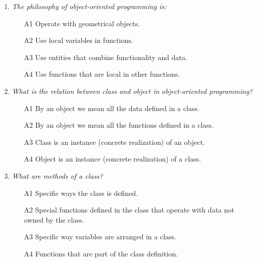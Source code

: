 \begin{enumerate}

\item {\em The philosophy of object-oriented programming is:}\\

\begin{enumerate}
\item[A1] Operate with geometrical objects.
\item[A2] Use local variables in functions.
\item[A3] Use entities that combine functionality and data.
\item[A4] Use functions that are local in other functions.
\end{enumerate}

\vspace{6mm}

\item {\em What is the relation between {\em class} and {\em object} in object-oriented programming?}\\

\begin{enumerate}
\item[A1] By an object we mean all the data defined in a class.
\item[A2] By an object we mean all the functions defined in a class.
\item[A3] Class is an instance (concrete realization) of an object.
\item[A4] Object is an instance (concrete realization) of a class.
\end{enumerate}

\vspace{6mm}

\item {\em What are {\em methods} of a class?}\\

\begin{enumerate}
\item[A1] Specific ways the class is defined.
\item[A2] Special functions defined in the class that operate with data not owned by the class.
\item[A3] Specific way variables are arranged in a class.
\item[A4] Functions that are part of the class definition.
\end{enumerate}

\vspace{6mm}


\end{enumerate}
